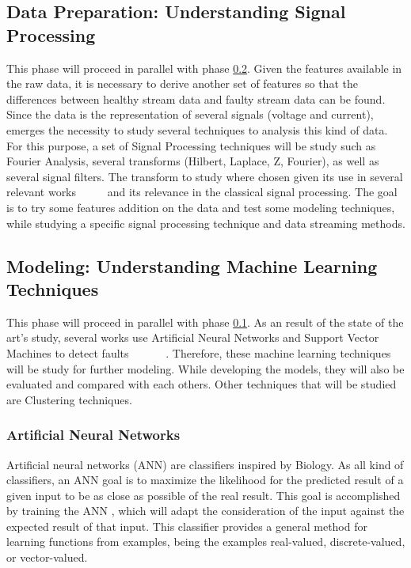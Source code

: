 \subsection{Data Preparation: Understanding Signal Processing}
\label{subsec:data_prep_studying_signal}

This phase will proceed in parallel with phase \ref{subsec:modeling_under_machine_learning}. Given the features available in the raw data, it is necessary to derive another set of features so that the differences between healthy stream data and faulty stream data can be found. Since the data is the representation of several signals (voltage and current), emerges the necessity to study several techniques to analysis this kind of data. For this purpose, a set of Signal Processing techniques will be study such as Fourier Analysis, several transforms (Hilbert, Laplace, Z, Fourier), as well as several signal filters.
The transform to study where chosen given its use in several relevant works ~\cite{M.a2014} ~\cite{Riera-Guasp2015} ~\cite{Cheng2011} and its relevance in the classical signal processing.
The goal is to try some features addition on the data and test some modeling techniques, while studying a specific signal processing technique and data streaming methods.


\subsection{Modeling: Understanding Machine Learning Techniques}
\label{subsec:modeling_under_machine_learning}

This phase will proceed in parallel with phase \ref{subsec:data_prep_studying_signal}. As an result of the state of the art's study, several works use Artificial Neural Networks and Support Vector Machines to detect faults ~\cite{Toma2011} ~\cite{Wolkiewicz2013} ~\cite{Patel2016} ~\cite{Jagadanand2015}. Therefore, these machine learning techniques will be study for further modeling. While developing the models, they will also be evaluated and compared with each others.  
Other techniques that will be studied are Clustering techniques.

\subsubsection{Artificial Neural Networks}

Artificial neural networks (ANN) are classifiers inspired by Biology. As all kind of classifiers, an ANN goal is to maximize the likelihood for the predicted result of a given input to be as close as possible of the real result. This goal is accomplished by training the ANN , which will adapt the consideration of the input against the expected result of that input. This classifier provides a general method for learning functions from examples, being the examples real-valued, discrete-valued, or vector-valued.

